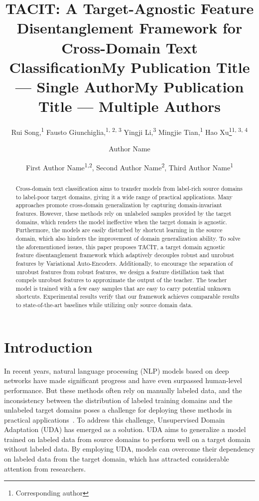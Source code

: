 \documentclass[letterpaper]{article} %
\title{TACIT: A Target-Agnostic Feature Disentanglement Framework for Cross-Domain Text Classification}
\author{
    Rui Song,\textsuperscript{\rm 1}
    Fausto Giunchiglia,\textsuperscript{\rm 1, \rm 2, \rm 3}
    Yingji Li,\textsuperscript{\rm 3}
    Mingjie Tian,\textsuperscript{\rm 1}
    Hao Xu\thanks{Corresponding author}\textsuperscript{\rm 1, \rm 3, \rm 4}
}
\title{My Publication Title --- Single Author}
\author {
    Author Name
}
\title{My Publication Title --- Multiple Authors}
\author {
    First Author Name\textsuperscript{\rm 1,\rm 2},
    Second Author Name\textsuperscript{\rm 2},
    Third Author Name\textsuperscript{\rm 1}
}
\begin{document}
\maketitle

\begin{abstract}
Cross-domain text classification aims to transfer models from label-rich source domains to label-poor target domains, giving it a wide range of practical applications. Many approaches promote cross-domain generalization by capturing domain-invariant features. However, these methods rely on unlabeled samples provided by the target domains, which renders the model ineffective when the target domain is agnostic. Furthermore, the models are easily disturbed by shortcut learning in the source domain, which also hinders the improvement of domain generalization ability. To solve the aforementioned issues, this paper proposes TACIT, a target domain agnostic feature disentanglement framework which adaptively decouples robust and unrobust features by Variational Auto-Encoders. Additionally, to encourage the separation of unrobust features from robust features, we design a feature distillation task that compels unrobust features to approximate the output of the teacher. The teacher model is trained with a few easy samples that are easy to carry potential unknown shortcuts. Experimental results verify that our framework achieves comparable results to state-of-the-art baselines while utilizing only source domain data.
\end{abstract}

\section{Introduction}
In recent years, natural language processing (NLP) models based on deep networks have made significant progress and have even surpassed human-level performance. But these methods often rely on manually labeled data, and the inconsistency between the distribution of labeled training domains and the unlabeled target domains poses a challenge for deploying these methods in practical applications~\cite{Ben-DavidRR20}. To address this challenge, Unsupervised Domain Adaptation (UDA) has emerged as a solution. UDA aims to generalize a model trained on labeled data from source domains to perform well on a target domain without labeled data. By employing UDA, models can overcome their dependency on labeled data from the target domain, which has attracted considerable attention from researchers.
\end{document}
